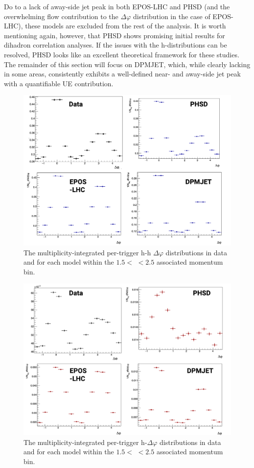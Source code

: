 Do to a lack of away-side jet peak in both EPOS-LHC and PHSD (and the overwhelming flow contribution to the $\Delta\varphi$ distribution in the case of EPOS-LHC), these models are excluded from the rest of the analysis. It is worth mentioning again, however, that PHSD shows promising initial results for dihadron correlation analyses. If the issues with the h-\lmb distributions can be resolved, PHSD looks like an excellent theoretical framework for these studies. The remainder of this section will focus on DPMJET, which, while clearly lacking in some areas, consistently exhibits a well-defined near- and away-side jet peak with a quantifiable UE contribution.

\begin{figure}
\centering
\includegraphics[width=\textwidth]{figures/results/h_h_1d_modelcomp.png}
\caption{The multiplicity-integrated per-trigger h-h $\Delta\varphi$ distributions in data and for each model within the $1.5 <$ \pt $< 2.5$ \GeVc associated momentum bin.}
\label{fig:h_h_1d_model}
\end{figure}

\begin{figure}
\centering
\includegraphics[width=\textwidth]{figures/results/h_lambda_1d_modelcomp.png}
\caption{The multiplicity-integrated per-trigger h-\lmb $\Delta\varphi$ distributions in data and for each model within the $1.5 <$ \pt $< 2.5$ \GeVc associated momentum bin.}
\label{fig:h_lambda_1d_model}
\end{figure}

